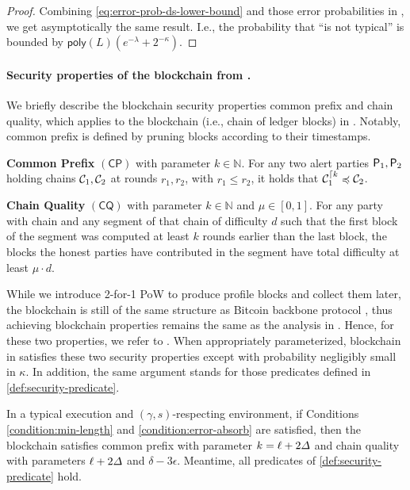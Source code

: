 \begin{proof}
    Combining \cref{eq:error-prob-ds-lower-bound} and those error probabilities in \cite{EPRINT:GarKiaLeo20}, we get asymptotically the same result. I.e., the probability that ``\E is not typical'' is bounded by $\mathsf{poly}(L)(e^{-\lambda} + 2^{-\kappa})$.
\end{proof}

\paragraph{Security properties of the \Taxis blockchain from \cite{EPRINT:GarKiaLeo20}.}
%
We briefly describe the blockchain security properties common prefix and chain quality, which applies to the blockchain (i.e., chain of ledger blocks) in \Taxis.
%
Notably, common prefix is defined by pruning blocks according to their timestamps.

\begin{cccItemize}[noitemsep]
    \item \textbf{Common Prefix} $(\mathsf{CP})$ with parameter $k \in \mathbb{N}$.
    For any two alert parties $\mathsf{P}_1, \mathsf{P}_2$ holding chains $\mathcal{C}_1, \mathcal{C}_2$ at rounds $r_1, r_2$, with $r_1 \le r_2$, it holds that $\mathcal{C}_1^{\lceil k} \preccurlyeq \mathcal{C}_2$.
    \item \textbf{Chain Quality} $(\mathsf{CQ})$ with parameter $k \in \mathbb{N}$ and $\mu \in [0, 1]$.
    For any party \party with chain \chain and any segment of that chain of difficulty $d$ such that the first block of the segment was computed at least $k$ rounds earlier than the last block, the blocks the honest parties have contributed in the segment have total difficulty at least $\mu \cdot d$.
\end{cccItemize}

While we introduce 2-for-1 PoW to produce profile blocks and collect them later, the \Taxis blockchain is still of the same structure as Bitcoin backbone protocol \cite{EC:GarKiaLeo15,C:GarKiaLeo17}, thus achieving blockchain properties remains the same as the analysis in \cite{EPRINT:GarKiaLeo20}.
%
Hence, for these two properties, we refer to \cite{EPRINT:GarKiaLeo20}.
%
When appropriately parameterized, blockchain in \Taxis satisfies these two security properties except with probability negligibly small in $\kappa$.
%
In addition, the same argument stands for those predicates defined in \cref{def:security-predicate}.

\begin{theorem}
    In a typical execution and $(\gamma, s)$-respecting environment, if Conditions \eqref{condition:min-length} and \eqref{condition:error-absorb} are satisfied, then the \Taxis blockchain satisfies common prefix with parameter $k = \ell + 2\varDelta$ and chain quality with parameters $\ell + 2\varDelta$ and $\delta - 3\epsilon$.
    Meantime, all predicates of \cref{def:security-predicate} hold.
\end{theorem}

